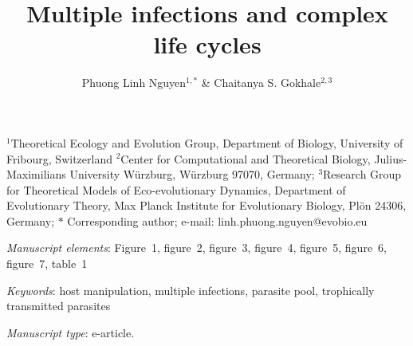 \documentclass[11pt]{article}
\title{Multiple infections and complex life cycles}
\author{Phuong Linh Nguyen$^{1,\ast}$ \& 
Chaitanya S. Gokhale$^{2,3}$
}
\date{}
\begin{document}
\maketitle

%
\noindent{} $^1$Theoretical Ecology and Evolution Group, Department of Biology, University of Fribourg, Switzerland
\noindent{} $^2$Center for Computational and Theoretical Biology, Julius-Maximilians University W\"{urzburg}, W\"{urzburg} 97070, Germany;
\noindent{} $^3$Research Group for Theoretical Models of Eco-evolutionary Dynamics, Department of Evolutionary Theory, Max Planck Institute for Evolutionary Biology, Pl\"{o}n 24306, Germany;
%
\noindent{} $\ast$ Corresponding author; e-mail: linh.phuong.nguyen@evobio.eu

\bigskip

\textit{Manuscript elements}:  Figure~1, figure~2, figure~3, figure~4, figure~5, figure~6, figure~7, table~1%

\bigskip

\textit{Keywords}: host manipulation, multiple infections, parasite pool, trophically transmitted parasites


\bigskip

\textit{Manuscript type}: e-article. %

\bigskip


\linenumbers{}

\newpage{}
\end{document}
